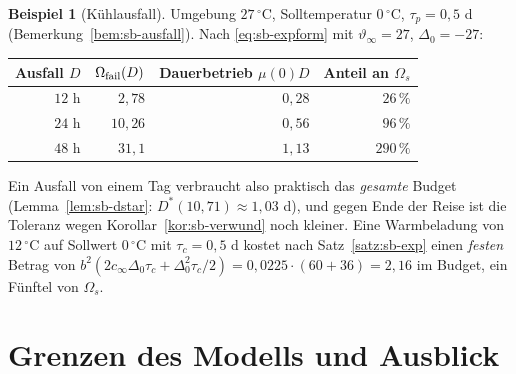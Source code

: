 \documentclass[a4paper, 12pt, twoside, openright]{report}
\theoremstyle{definition}
\theoremstyle{definition}
\newtheorem{beispiel}{Beispiel}[chapter]
\begin{document}
\begin{beispiel}[Kühlausfall]\label{bsp:sb-ausfall}
Umgebung $27\,{}^\circ$C, Solltemperatur $0\,{}^\circ$C, $\tau_p=0{,}5$ d (Bemerkung~\ref{bem:sb-ausfall}).
Nach \eqref{eq:sb-expform} mit $\vartheta_\infty=27$, $\Delta_0=-27$:
\begin{center}
\begin{tabular}{rrrr}
\toprule
Ausfall $D$ & $\Omega_{\rm fail}(D)$ & Dauerbetrieb $\mu(0)D$ & Anteil an $\Omega_s$\\
\midrule
$12$ h  & $2{,}78$  & $0{,}28$ & $26\,\%$\\
$24$ h  & $10{,}26$ & $0{,}56$ & $96\,\%$\\
$48$ h  & $31{,}1$  & $1{,}13$ & $290\,\%$\\
\bottomrule
\end{tabular}
\end{center}
Ein Ausfall von einem Tag verbraucht also praktisch das \emph{gesamte} Budget (Lemma~\ref{lem:sb-dstar}:
$D^\ast(10{,}71)\approx1{,}03$ d), und gegen Ende der Reise ist die Toleranz wegen
Korollar~\ref{kor:sb-verwund} noch kleiner. Eine Warmbeladung von $12\,{}^\circ$C auf Sollwert $0\,{}^\circ$C mit
$\tau_c=0{,}5$ d kostet nach Satz~\ref{satz:sb-exp} einen \emph{festen} Betrag von
$b^2(2c_\infty\Delta_0\tau_c+\Delta_0^2\tau_c/2)=0{,}0225\cdot(60+36)=2{,}16$ im Budget, ein Fünftel von $\Omega_s$.
\end{beispiel}

\section{Grenzen des Modells und Ausblick}
\label{sec:sb-grenzen}
\end{document}
